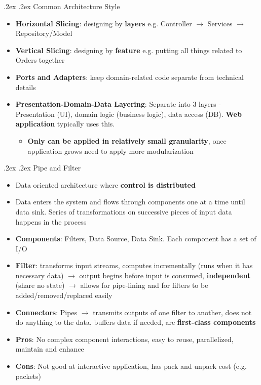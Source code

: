 \documentclass[10pt,landscape,a4paper]{article}
\makeatletter
\renewcommand{\subsection}{\@startsection{subsection}{1}{0mm}%
	{.2ex}%
	{.2ex}%
	{\sffamily\bfseries}}
\renewcommand{\subsubsection}{\@startsection{subsubsection}{1}{0mm}%
	{.2ex}%
	{.2ex}%
	{\rmfamily\bfseries}}
\makeatother
\begin{document}
\begin{multicols*}{4}
		\subsection{Common Architecture Style}
		\begin{itemize}
			\item \textbf{Horizontal Slicing}: designing by \textbf{layers} e.g. Controller $\rightarrow$ Services $\rightarrow$ Repository/Model
			\item \textbf{Vertical Slicing}: designing by \textbf{feature} e.g. putting all things related to Orders together
			\item \textbf{Ports and Adapters}: keep domain-related code separate from technical details
			\item \textbf{Presentation-Domain-Data Layering}: Separate into 3 layers - Presentation (UI), domain logic (business logic), data access (DB). \textbf{Web application} typically uses this. 
			\begin{itemize}
				\item \textbf{Only can be applied in relatively small granularity}, once application grows need to apply more modularization
			\end{itemize}
		\end{itemize}
		\subsubsection{Pipe and Filter}
		\begin{itemize}
			\item Data oriented architecture where \textbf{control is distributed}
			\item Data enters the system and flows through components one at a time until data sink. Series of transformations on successive pieces of input data happens in the process
			\item \textbf{Components}: Filters, Data Source, Data Sink. Each component has a set of I/O
			\item \textbf{Filter}: transforms input streams, computes incrementally (runs when it has necessary data) $\rightarrow$ output begins before input is consumed, \textbf{independent} (share no state) $\rightarrow$ allows for pipe-lining and for filters to be added/removed/replaced easily
			\item \textbf{Connectors}: Pipes $\rightarrow$ transmits outputs of one filter to another, does not do anything to the data, buffers data if needed, are \textbf{first-class components}
			\item \textbf{Pros}: No complex component interactions, easy to reuse, parallelized, maintain and enhance
			\item \textbf{Cons}: Not good at interactive application, has pack and unpack cost (e.g. packets)
		\end{itemize}

\end{multicols*}
\end{document}
